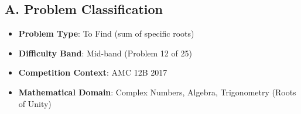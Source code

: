 \documentclass[11pt]{article}
\begin{document}
\begin{problemconfigbox}
\subsection*{A. Problem Classification}
\begin{itemize}[leftmargin=*]
    \item \textbf{Problem Type}: To Find (sum of specific roots)
    \item \textbf{Difficulty Band}: Mid-band (Problem 12 of 25)
    \item \textbf{Competition Context}: AMC 12B 2017
    \item \textbf{Mathematical Domain}: Complex Numbers, Algebra, Trigonometry (Roots of Unity)
\end{itemize}


\end{problemconfigbox}
\end{document}
